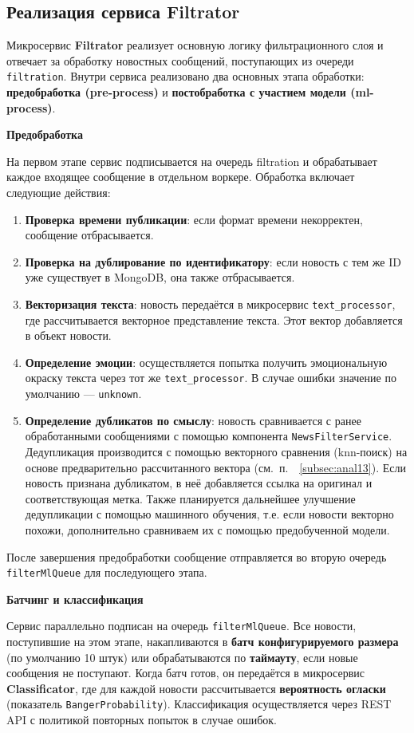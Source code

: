 \subsection{Реализация сервиса Filtrator}
Микросервис \textbf{Filtrator} реализует основную логику фильтрационного слоя и отвечает за обработку новостных сообщений, поступающих из очереди \texttt{filtration}.
Внутри сервиса реализовано два основных этапа обработки: \textbf{предобработка (pre-process)} и \textbf{постобработка с участием модели (ml-process)}.

\textbf{Предобработка}

На первом этапе сервис подписывается на очередь filtration и обрабатывает каждое входящее сообщение в отдельном воркере. Обработка включает следующие действия:
\begin{enumerate}
    \item \textbf{Проверка времени публикации}: если формат времени некорректен, сообщение отбрасывается.
    \item \textbf{Проверка на дублирование по идентификатору}: если новость с тем же ID уже существует в MongoDB, она также отбрасывается.
    \item \textbf{Векторизация текста}: новость передаётся в микросервис \texttt{text\_processor}, где рассчитывается векторное представление текста. Этот вектор добавляется в объект новости.
    \item \textbf{Определение эмоции}: осуществляется попытка получить эмоциональную окраску текста через тот же \texttt{text\_processor}. В случае ошибки значение по умолчанию — \texttt{unknown}.
    \item \textbf{Определение дубликатов по смыслу}: новость сравнивается с ранее обработанными сообщениями с помощью компонента \texttt{NewsFilterService}.
    Дедупликация производится с помощью векторного сравнения (knn-поиск) на основе предварительно рассчитанного вектора (см.\ п.\ ~\ref{subsec:anal13}).
    Если новость признана дубликатом, в неё добавляется ссылка на оригинал и соответствующая метка.
    Также планируется дальнейшее улучшение дедупликации с помощью машинного обучения, т.е. если новости векторно похожи, дополнительно сравниваем их с помощью предобученной модели.
\end{enumerate}

После завершения предобработки сообщение отправляется во вторую очередь \texttt{filterMlQueue} для последующего этапа.

\textbf{Батчинг и классификация}

Сервис параллельно подписан на очередь \texttt{filterMlQueue}.
Все новости, поступившие на этом этапе, накапливаются в \textbf{батч конфигурируемого размера} (по умолчанию 10 штук) или обрабатываются по \textbf{таймауту}, если новые сообщения не поступают.
Когда батч готов, он передаётся в микросервис \textbf{Classificator}, где для каждой новости рассчитывается \textbf{вероятность огласки} (показатель \texttt{BangerProbability}).
Классификация осуществляется через REST API с политикой повторных попыток в случае ошибок.

